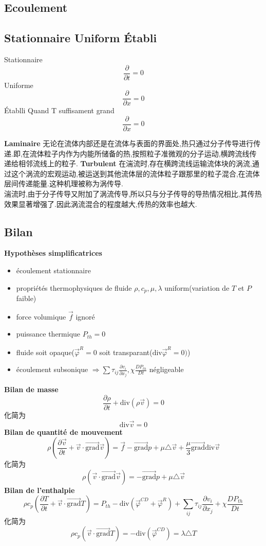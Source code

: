 \documentclass{article}
\begin{document}
\subsection{Ecoulement}
\subsection{Stationnaire Uniform \'Etabli}
Stationnaire
$$ \frac{\partial  }{\partial t}=0 $$
Uniforme
$$ \frac{\partial  }{\partial x}=0 $$
\'Etablli
Quand T suffisament grand
$$ \frac{\partial  }{\partial x}=0 $$

\textbf{Laminaire}
无论在流体内部还是在流体与表面的界面处,热只通过分子传导进行传递.即,在流体粒子内作为内能所储备的热,按照粒子准微观的分子运动,横跨流线传递给相邻流线上的粒子.
\textbf{Turbulent}
在湍流时,存在横跨流线运输流体块的涡流,通过这个涡流的宏观运动,被运送到其他流体层的流体粒子跟那里的粒子混合,在流体层间传递能量.这种机理被称为涡传导.\\
湍流时,由于分子传导又附加了涡流传导,所以只与分子传导的导热情况相比,其传热效果显著增强了.因此涡流混合的程度越大,传热的效率也越大.

\subsection{Bilan}
\textbf{Hypoth\`eses simplificatrices}
\begin{itemize}
\item \'ecoulement stationnaire
\item propri\'et\'es thermophysiques de fluide $\rho, c_p, \mu,\lambda $ uniform(variation de $T$ et $P$ faible)
\item force volumique $\vec{f}$ ignor\'e
\item puissance thermique $P_{th}=0$
\item fluide soit opaque($\vec{\varphi}^R = 0$ soit transparant($\mbox{div} \vec{\varphi}^R=0)$)
\item \'ecoulement subsonique $\Rightarrow \sum \tau_{ij}\frac{\partial  v_i}{\partial x_j},\chi\frac{ DP_{th}}{Dt}$ n\'egligeable
\end{itemize}
\textbf{Bilan de masse}
$$\frac{\partial  \rho}{\partial t} + \mbox{div} (\rho \vec{v})=0 $$
化简为
$$\mbox{div} \vec{v}=0$$
\textbf{Bilan de quantit\'e de mouvement}
$$
\rho(\frac{\partial  \vec{v}}{\partial t}+ \vec{v}\cdot \vec{\mbox{grad}}\vec{v}) =  \vec{f} - \vec{\mbox{grad}} p + \mu \triangle\vec{v} + \frac{\mu}{3}\vec{\mbox{grad}} \mbox{div} \vec{v}
$$
化简为
$$
\rho(  \vec{v}\cdot \vec{\mbox{grad}}\vec{v}) =   - \vec{\mbox{grad}} p + \mu \triangle\vec{v}
$$
\textbf{Bilan de l'enthalpie}
$$
\rho c_p (\frac{\partial  T}{\partial t} + \vec{v}\cdot \vec{\mbox{grad}} T)=P_{th} - \mbox{div} (\vec{\varphi}^{CD}+\vec{\varphi}^R) +  \sum_{ij} \tau_{ij}\frac{\partial  v_i}{\partial x_j} + \chi\frac{ DP_{th}}{Dt}
$$
化简为
$$
\rho c_p ( \vec{v}\cdot \vec{\mbox{grad}} T)=- \mbox{div} (\vec{\varphi}^{CD}) =\lambda \triangle T
$$
\end{document}
